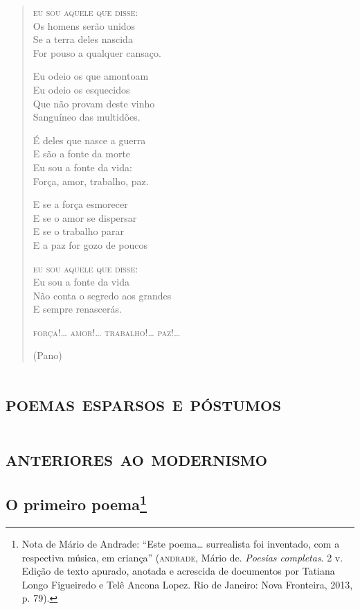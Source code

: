 {\begin{verse}
\textsc{eu sou aquele que disse:}\\
Os homens serão unidos\\
Se a terra deles nascida\\
For pouso a qualquer cansaço.

Eu odeio os que amontoam\\
Eu odeio os esquecidos\\
Que não provam deste vinho\\
Sanguíneo das multidões.

É deles que nasce a guerra\\
E são a fonte da morte\\
Eu sou a fonte da vida:\\
Força, amor, trabalho, paz.

E se a força esmorecer\\
E se o amor se dispersar\\
E se o trabalho parar\\
E a paz for gozo de poucos

\textsc{eu sou aquele que disse}:\\
Eu sou a fonte da vida\\
Não conta o segredo aos grandes\\
E sempre renascerás.

\textsc{força}!\ldots{} \textsc{amor}!\ldots{} \textsc{trabalho}!\ldots{} \textsc{paz}!\ldots{}

\hfill(Pano)
\end{verse}

\movetooddpage
\part{\textsc{poemas esparsos e póstumos}}

\paginabranca
{}
\part*{\textsc{anteriores ao modernismo}}

\chapter{O primeiro poema\footnote[*]{Nota de Mário de Andrade: ``Este
  poema\ldots{} surrealista foi inventado, com a respectiva música, em
  criança'' (\textsc{andrade}, Mário de. \emph{Poesias completas}. 2 v. Edição de
  texto apurado, anotada e acrescida de documentos por Tatiana Longo
  Figueiredo e Telê Ancona Lopez. Rio de Janeiro: Nova Fronteira, 2013,
  p. 79).}}

}
